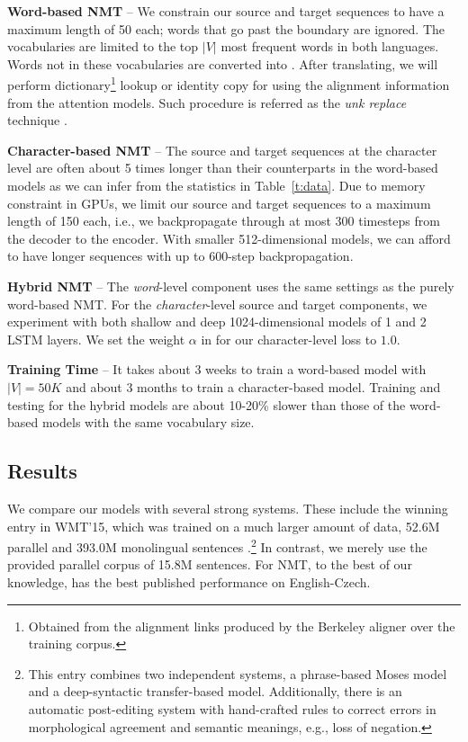 {\bf Word-based NMT} -- We constrain our source and target sequences to
have a maximum length of 50 each; words that go past the boundary are ignored.
The vocabularies are limited to the top $|V|$ most %
frequent words in both languages. Words not in these vocabularies
are converted into \unk{}. After translating, we will perform
dictionary\footnote{Obtained from the alignment links produced by the Berkeley
aligner \cite{liang06alignment} over
the training corpus.} lookup or
identity copy for \unk{} using the alignment information from the
attention models. Such procedure is referred as the {\it unk replace}
technique \cite{luong15,jean15}.

{\bf Character-based NMT} -- The source and
target sequences at the character level are often about 5 times longer than their counterparts in the
word-based models as we can infer from the statistics in
Table~\ref{t:data}. Due to memory constraint in GPUs, we limit our source and
target sequences to a maximum length of 150 each, i.e., we backpropagate
through at most 300 timesteps from the decoder to the encoder. With
smaller 512-dimensional models, we can afford to have longer sequences with up
to 600-step backpropagation. 

{\bf Hybrid NMT} -- The {\it word}-level component uses the
same settings as the purely word-based NMT. For the {\it character}-level source
and target components, we experiment with both shallow and deep 1024-dimensional models of
1 and 2 LSTM layers. 
We
set the weight $\alpha$ in  for our character-level loss to
$1.0$.

{\bf Training Time} -- It takes about 3 weeks to train a word-based model with
$|V|=50K$ and about 3 months to train a character-based model. Training and
testing for the hybrid models are about 10-20\% slower than those of the word-based
models with the same vocabulary size.

\subsection{Results}

We compare our models with several strong systems. These include the
winning entry in WMT'15, which was
trained on a much larger amount of data, 52.6M parallel
 and 393.0M monolingual sentences \cite{bojar15wmt}.\footnote{This
entry combines two independent
systems, a phrase-based Moses model and a deep-syntactic transfer-based model.
Additionally, there is  an automatic
post-editing system with hand-crafted rules to correct errors
in morphological agreement and semantic meanings, e.g., loss of negation.}
In contrast, we merely use the
provided parallel corpus of 15.8M sentences. %
For NMT, to the best of our knowledge, \cite{jean15wmt} has
the best published performance on English-Czech.

